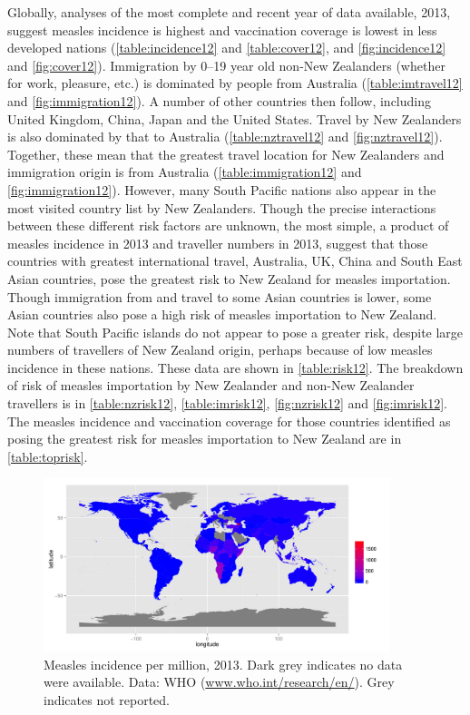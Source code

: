 \documentclass{article}
\begin{document}
Globally, analyses of the most complete and recent year of data available, 2013, suggest measles incidence is highest  and vaccination coverage is lowest in less developed nations (\autoref{table:incidence12} and \autoref{table:cover12}, and \autoref{fig:incidence12} and \autoref{fig:cover12}). Immigration by 0--19 year old non-New Zealanders (whether for work, pleasure, etc.) is dominated by people from Australia (\autoref{table:imtravel12} and \autoref{fig:immigration12}). A number of other countries then follow, including United Kingdom, China, Japan and the United States. Travel by New Zealanders is also dominated by that to Australia (\autoref{table:nztravel12} and \autoref{fig:nztravel12}). Together, these mean that the greatest travel location for New Zealanders and immigration origin is from Australia (\autoref{table:immigration12} and \autoref{fig:immigration12}). However, many South Pacific nations also appear in the most visited country list by New Zealanders. Though the precise interactions between these different risk factors are unknown, the most simple, a product of measles incidence in 2013 and traveller numbers in 2013, suggest that those countries with greatest international travel, Australia, UK, China and South East Asian countries, pose the greatest risk to New Zealand for measles importation. Though immigration from and travel to some Asian countries is lower, some Asian countries also pose a high risk of measles importation to New Zealand. Note that South Pacific islands do not appear to pose a greater risk, despite large numbers of travellers of New Zealand origin, perhaps because of low measles incidence in these nations. These data are shown in \autoref{table:risk12}. The breakdown of risk of measles importation by New Zealander and non-New Zealander travellers is in \autoref{table:nzrisk12}, \autoref{table:imrisk12}, \autoref{fig:nzrisk12} and \autoref{fig:imrisk12}. The measles incidence and vaccination coverage for those countries identified as posing the greatest risk for measles importation to New Zealand are in \autoref{table:toprisk}. 

\begin{figure}
\begin{center}
     \includegraphics[width=0.9\textwidth]{2013totnp2.pdf}
\end{center}
\caption{Measles incidence per million, 2013. Dark grey indicates no data were available. Data: WHO (\href{http://www.who.int/research/en/}{www.who.int/research/en/}). Grey indicates not reported.}
\label{fig:incidence12}
\end{figure}
\end{document}
